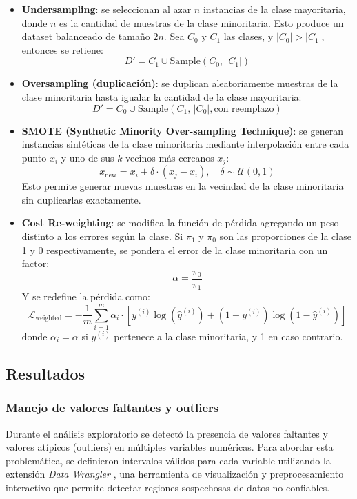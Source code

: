 \documentclass[11pt]{article}
\begin{document}
\begin{itemize}
    \item \textbf{Undersampling}: se seleccionan al azar $n$ instancias de la clase mayoritaria, donde $n$ es la cantidad de muestras de la clase minoritaria. Esto produce un dataset balanceado de tamaño $2n$. Sea $C_0$ y $C_1$ las clases, y $|C_0| > |C_1|$, entonces se retiene:
    \[
    D' = C_1 \cup \text{Sample}(C_0, \, |C_1|)
    \]

    \item \textbf{Oversampling (duplicación)}: se duplican aleatoriamente muestras de la clase minoritaria hasta igualar la cantidad de la clase mayoritaria:
    \[
    D' = C_0 \cup \text{Sample}(C_1, \, |C_0|, \text{con reemplazo})
    \]

    \item \textbf{SMOTE (Synthetic Minority Over-sampling Technique)}: se generan instancias sintéticas de la clase minoritaria mediante interpolación entre cada punto $x_i$ y uno de sus $k$ vecinos más cercanos $x_j$:
    \[
    x_{\text{new}} = x_i + \delta \cdot (x_j - x_i), \quad \delta \sim \mathcal{U}(0,1)
    \]
    Esto permite generar nuevas muestras en la vecindad de la clase minoritaria sin duplicarlas exactamente.

    \item \textbf{Cost Re-weighting}: se modifica la función de pérdida agregando un peso distinto a los errores según la clase. Si $\pi_1$ y $\pi_0$ son las proporciones de la clase 1 y 0 respectivamente, se pondera el error de la clase minoritaria con un factor:
    \[
    \alpha = \frac{\pi_0}{\pi_1}
    \]
    Y se redefine la pérdida como:
    \[
    \mathcal{L}_{\text{weighted}} = -\frac{1}{m} \sum_{i=1}^{m} \alpha_i \cdot \left[ y^{(i)} \log(\hat{y}^{(i)}) + (1 - y^{(i)}) \log(1 - \hat{y}^{(i)}) \right]
    \]
    donde $\alpha_i = \alpha$ si $y^{(i)}$ pertenece a la clase minoritaria, y 1 en caso contrario.
\end{itemize}

\subsection{Resultados}
\subsubsection*{Manejo de valores faltantes y outliers}

Durante el análisis exploratorio se detectó la presencia de valores faltantes y valores atípicos (outliers) en múltiples variables numéricas. Para abordar esta problemática, se definieron intervalos válidos para cada variable utilizando la extensión \textit{Data Wrangler} \cite{datawrangler2023}, una herramienta de visualización y preprocesamiento interactivo que permite detectar regiones sospechosas de datos no confiables.
\end{document}
